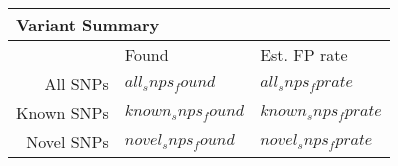 \documentclass[10pt]{article}
\begin{document}
\begin{multicols}{2}
        \begin{tabular}{|r|l|l|}
            \multicolumn{3}{l}{\bfseries{Variant Summary}} \\
            \hline
            & Found & Est. FP rate \\
            \hline
            All SNPs & $all_snps_found$ & $all_snps_fprate$ \\
            Known SNPs & $known_snps_found$ & $known_snps_fprate$ \\
            Novel SNPs & $novel_snps_found$ & $novel_snps_fprate$ \\
            \hline
        \end{tabular}
    \end{multicols}

\end{document}
